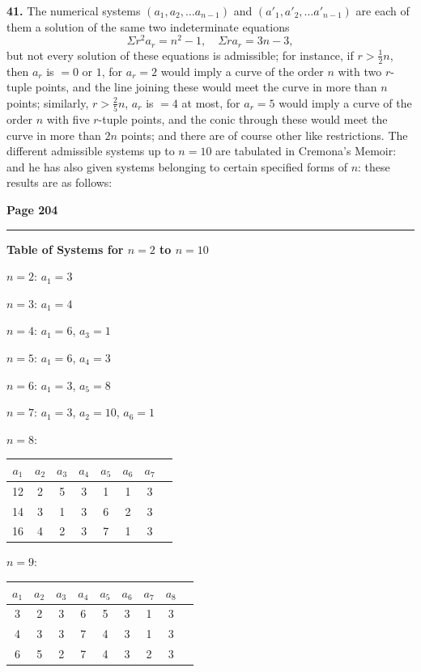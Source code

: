 \documentclass[12pt,a4paper]{article}
\theoremstyle{plain}
\theoremstyle{definition}
\theoremstyle{remark}
\begin{document}
\textbf{41.} The numerical systems $(a_1, a_2, \ldots a_{n-1})$ and $(a'_1, a'_2, \ldots a'_{n-1})$ are each of them a solution of the same two indeterminate equations
\[
\Sigma r^2 a_r = n^2 - 1, \quad \Sigma r a_r = 3n - 3,
\]
but not every solution of these equations is admissible; for instance, if $r > \frac{1}{2}n$, then $a_r$ is $= 0$ or $1$, for $a_r = 2$ would imply a curve of the order $n$ with two $r$-tuple points, and the line joining these would meet the curve in more than $n$ points; similarly, $r > \frac{2}{5}n$, $a_r$ is $= 4$ at most, for $a_r = 5$ would imply a curve of the order $n$ with five $r$-tuple points, and the conic through these would meet the curve in more than $2n$ points; and there are of course other like restrictions. The different admissible systems up to $n = 10$ are tabulated in Cremona's Memoir: and he has also given systems belonging to certain specified forms of $n$: these results are as follows:

\newpage
\noindent\textbf{Page 204}\\
\noindent\rule{\textwidth}{0.4pt}

\smallskip

\begin{center}
\textbf{Table of Systems for $n = 2$ to $n = 10$}
\end{center}

\smallskip

\noindent\textbf{$n = 2$}: $a_1 = 3$

\noindent\textbf{$n = 3$}: $a_1 = 4$

\noindent\textbf{$n = 4$}: $a_1 = 6$, $a_3 = 1$

\noindent\textbf{$n = 5$}: $a_1 = 6$, $a_4 = 3$

\noindent\textbf{$n = 6$}: $a_1 = 3$, $a_5 = 8$

\noindent\textbf{$n = 7$}: $a_1 = 3$, $a_2 = 10$, $a_6 = 1$

\noindent\textbf{$n = 8$}: 
\begin{tabular}[t]{cccccccc}
$a_1$ & $a_2$ & $a_3$ & $a_4$ & $a_5$ & $a_6$ & $a_7$ & \\
\hline
12 & 2 & 5 & 3 & 1 & 1 & 3 & \\
14 & 3 & 1 & 3 & 6 & 2 & 3 & \\
16 & 4 & 2 & 3 & 7 & 1 & 3 & \\
\end{tabular}

\noindent\textbf{$n = 9$}:
\begin{tabular}[t]{ccccccccc}
$a_1$ & $a_2$ & $a_3$ & $a_4$ & $a_5$ & $a_6$ & $a_7$ & $a_8$ & \\
\hline
3 & 2 & 3 & 6 & 5 & 3 & 1 & 3 & \\
4 & 3 & 3 & 7 & 4 & 3 & 1 & 3 & \\
6 & 5 & 2 & 7 & 4 & 3 & 2 & 3 & \\
\end{tabular}
\end{document}
